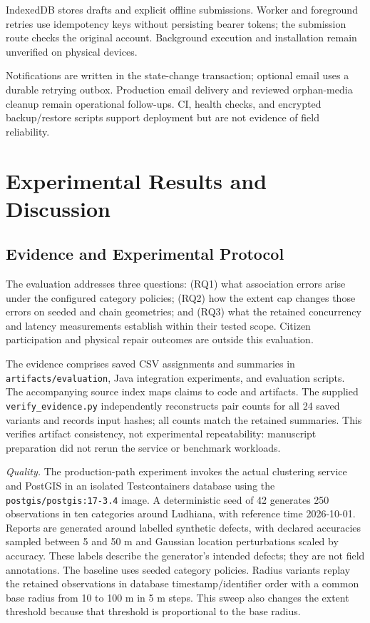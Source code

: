 \documentclass[conference,a4paper]{IEEEtran}
\begin{document}
IndexedDB stores drafts and explicit offline submissions. Worker and foreground retries use idempotency keys without persisting bearer tokens; the submission route checks the original account. Background execution and installation remain unverified on physical devices.

Notifications are written in the state-change transaction; optional email uses a durable retrying outbox. Production email delivery and reviewed orphan-media cleanup remain operational follow-ups. CI, health checks, and encrypted backup/restore scripts support deployment but are not evidence of field reliability.

\section{Experimental Results and Discussion}
\subsection{Evidence and Experimental Protocol}
The evaluation addresses three questions: (RQ1) what association errors arise under the configured category policies; (RQ2) how the extent cap changes those errors on seeded and chain geometries; and (RQ3) what the retained concurrency and latency measurements establish within their tested scope. Citizen participation and physical repair outcomes are outside this evaluation.

The evidence comprises saved CSV assignments and summaries in \texttt{artifacts/evaluation}, Java integration experiments, and evaluation scripts. The accompanying source index maps claims to code and artifacts. The supplied \texttt{verify\_evidence.py} independently reconstructs pair counts for all 24 saved variants and records input hashes; all counts match the retained summaries. This verifies artifact consistency, not experimental repeatability: manuscript preparation did not rerun the service or benchmark workloads.

\textit{Quality.} The production-path experiment invokes the actual clustering service and PostGIS in an isolated Testcontainers database using the \texttt{postgis/postgis:17-3.4} image. A deterministic seed of 42 generates 250 observations in ten categories around Ludhiana, with reference time 2026-10-01. Reports are generated around labelled synthetic defects, with declared accuracies sampled between 5 and 50 m and Gaussian location perturbations scaled by accuracy. These labels describe the generator's intended defects; they are not field annotations. The baseline uses seeded category policies. Radius variants replay the retained observations in database timestamp/identifier order with a common base radius from 10 to 100 m in 5 m steps. This sweep also changes the extent threshold because that threshold is proportional to the base radius.
\end{document}
